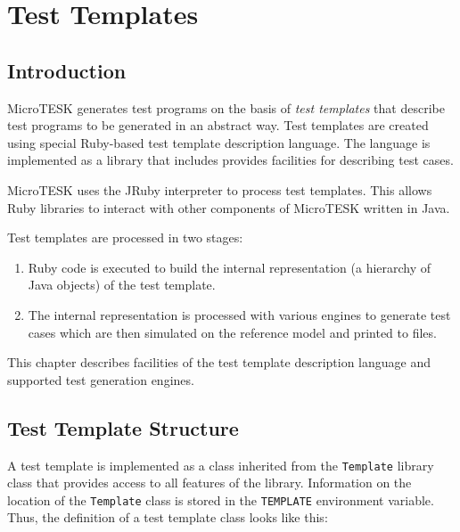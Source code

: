 \documentclass[oneside,final,12pt]{extreport}
\begin{document}

\chapter{Test Templates}


\section{Introduction}

MicroTESK generates test programs on the basis of \emph{test templates} that describe
test programs to be generated in an abstract way. Test templates are created using
special Ruby-based test template description language. The language is implemented as
a library that includes provides facilities for describing test cases.

MicroTESK uses the JRuby interpreter to process test templates. This allows Ruby libraries
to interact with other components of MicroTESK written in Java.

Test templates are processed in two stages:
\begin{enumerate}
\item \label{ttp_stage_1} Ruby code is executed to build the internal representation (a hierarchy
      of Java objects) of the test template.
\item \label{ttp_stage_2} The internal representation is processed with various engines to 
      generate test cases which are then simulated on the reference model and printed to files.
\end{enumerate}

This chapter describes facilities of the test template description language and supported test
generation engines.



\section{Test Template Structure}

A test template is implemented as a class inherited from the \texttt{Template} library class
that provides access to all features of the library. Information on the location of
the \texttt{Template} class is stored in the \texttt{TEMPLATE} environment variable.
Thus, the definition of a test template class looks like this:
\end{document}
